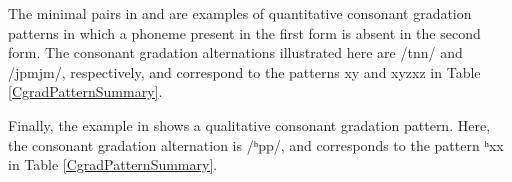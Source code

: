 The minimal pairs in  and  are examples of quantitative consonant gradation patterns in which a phoneme present in the first form is absent in the second form. The consonant gradation alternations illustrated here are /tn\Div n/ and /jpm\Div jm/, respectively, and correspond to the patterns x\Div y and xyz\Div xz in Table \vref{CgradPatternSummary}. 
\ea\label{CgradEx2a}%
\z
\ea\label{CgradEx2b}%
\z

Finally, the example in  shows a qualitative consonant gradation pattern. %
Here, the consonant gradation alternation is /ʰp\Div p/, and corresponds to the pattern ʰx\Div x in Table \vref{CgradPatternSummary}. 
\ea\label{CgradEx3}%
\z

